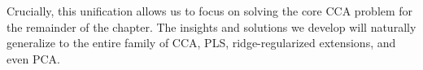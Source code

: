 Crucially, this unification allows us to focus on solving the core CCA problem for the remainder of the chapter. The insights and solutions we develop will naturally generalize to the entire family of CCA, PLS, ridge-regularized extensions, and even PCA.


